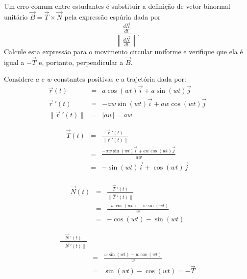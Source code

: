 \begin{exeresol}
Um erro comum entre estudantes é substituir a definição de vetor binormal unitário $\vec{B}=\vec{T}\times\vec{N}$ pela expressão espúria dada por $$\frac{\frac{d\vec{N}}{dt}}{\left\|\frac{d\vec{N}}{dt}\right\|}.$$ Calcule esta expressão para o movimento circular uniforme e verifique que ela é igual a $-\vec{T}$ e, portanto, perpendicular a $\vec{B}$.
\end{exeresol}
\begin{resol}
 Considere $a$ e $w$ constantes positivas e a trajetória dada por:
 \begin{eqnarray*}
\vec{r}(t)&=&a\cos(wt)\vec{i}+a\sin(wt)\vec{j}\\
\vec{r}~\!'(t)&=&-aw\sin(wt)\vec{i}+aw\cos(wt)\vec{j}\\
\|\vec{r}~\!'(t)\|&=&|aw|=aw.
 \end{eqnarray*}

 \begin{eqnarray*}
\vec{T}(t)&=&\frac{\vec{r}~\!'(t)}{\|\vec{r}~\!'(t)\|}\\
 &=&\frac{-aw\sin(wt)\vec{i}+aw\cos(wt)\vec{j}}{aw}\\
 &=&{-\sin(wt)\vec{i}+\cos(wt)\vec{j}}\\
 \end{eqnarray*}
 
 \begin{eqnarray*}
\vec{N}(t)&=&\frac{\vec{T}~\!'(t)}{\|\vec{T}~\!'(t)\|}\\
  &=&\frac{-w\cos(wt)-w\sin(wt)}{w}\\
  &=&{-\cos(wt)-\sin(wt)}
 \end{eqnarray*}
 
 \begin{eqnarray*}
\frac{\vec{N}~\!'(t)}{\|\vec{N}~\!'(t)\|}\\
  &=&\frac{w\sin(wt)-w\cos(wt)}{w}\\
  &=&{\sin(wt)-\cos(wt)}=-\vec{T}
 \end{eqnarray*}
\end{resol}

